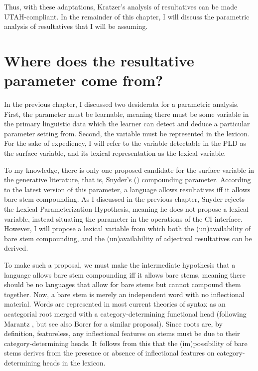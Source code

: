 \documentclass[MilwayThesis]{subfiles}
\begin{document}
Thus, with these adaptations, Kratzer's analysis of resultatives can be made UTAH-compliant.
In the remainder of this chapter, I will discuss the parametric analysis of resultatives that I will be assuming.

\section{Where does the resultative parameter come from?}
In the previous chapter, I discussed two desiderata for a parametric analysis.
First, the parameter must be learnable, meaning there must be some variable in the primary linguistic data which the learner can detect and deduce a particular parameter setting from.
Second, the variable must be represented in the lexicon.
For the sake of expediency, I will refer to the variable detectable in the PLD as the surface variable, and its lexical representation as the lexical variable.

To my knowledge, there is only one proposed candidate for the surface variable in the generative literature, that is, Snyder's (\citeyear{snyder1995language,snyder2012parameter}) compounding parameter.
According to the latest version of this parameter, a language allows resultatives iff it allows bare stem compounding.
As I discussed in the previous chapter, Snyder rejects the Lexical Parameterization Hypothesis, meaning he does not propose a lexical variable, instead situating the parameter in the operations of the CI interface.
However, I will propose a lexical variable from which both the (un)availability of bare stem compounding, and the (un)availability of adjectival resultatives can be derived.

To make such a proposal, we must make the intermediate hypothesis that a language allows bare stem compounding iff it allows bare stems, meaning there should be no languages that allow for bare stems but cannot compound them together.
Now, a bare stem is merely an independent word with no inflectional material.
Words are represented in most current theories of syntax as an acategorial root merged with a category-determining functional head (following Marantz \citeyear{marantz1997no}, but see also Borer \citeyear{borer2005name} for a similar proposal).
Since roots are, by definition, featureless, any inflectional features on stems must be due to their category-determining heads.
It follows from this that the (im)possibility of bare stems derives from the presence or absence of inflectional features on category-determining heads in the lexicon.
\end{document}
